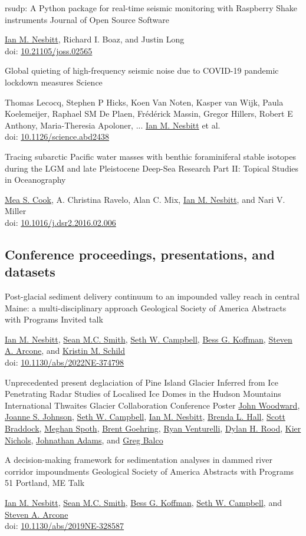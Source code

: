 \documentclass[a4paper,12pt,sans,colorlinks]{moderncv}
\newcommand{\me}{\href{https://www.iannesbitt.org}{Ian M. Nesbitt}}
\newcommand{\seth}{\href{https://www.alpinesciences.net}{Seth W. Campbell}}
\newcommand{\sean}{\href{https://umaine.edu/earthclimate/people/sean-m-c-smith/}{Sean M.C. Smith}}
\newcommand{\bess}{\href{https://www.colby.edu/directory/profile/bess.koffman/}{Bess G. Koffman}}
\newcommand{\stevearcone}{\href{https://engineering.dartmouth.edu/community/faculty/steven-arcone}{Steven A. Arcone}}
\newcommand{\kristin}{\href{https://climatechange.umaine.edu/people/kristin-schild/}{Kristin M. Schild}}
\newcommand{\richard}{Richard I. Boaz}
\newcommand{\mea}{\href{https://geosciences.williams.edu/profile/msc1/}{Mea S. Cook}}
\newcommand{\johnwoodward}{\href{https://www.northumbria.ac.uk/about-us/our-staff/w/john-woodward}{John Woodward}}
\newcommand{\joannejohnson}{\href{https://www.bas.ac.uk/profile/jsj/}{Joanne S. Johnson}}
\newcommand{\brenda}{\href{https://climatechange.umaine.edu/people/brenda-hall/}{Brenda L. Hall}}
\newcommand{\scott}{\href{https://climatechange.umaine.edu/people/scott-braddock/}{Scott Braddock}}
\newcommand{\meghan}{\href{https://climatechange.umaine.edu/people/meghan-spoth/}{Meghan Spoth}}
\newcommand{\brent}{\href{https://sse.tulane.edu/eens/faculty/goehring}{Brent Goehring}}
\newcommand{\ryanventurelli}{\href{https://sse.tulane.edu/eens/faculty/venturelli}{Ryan Venturelli}}
\newcommand{\dylanrood}{\href{http://www.imperial.ac.uk/people/d.rood}{Dylan H. Rood}}
\newcommand{\kiernichols}{\href{https://www.researchgate.net/profile/Keir-Nichols}{Kier Nichols}}
\newcommand{\johnathanadams}{\href{https://thwaitesglacier.org/people/jonathan-adams}{Johnathan Adams}}
\newcommand{\gregbalco}{\href{https://www.bgc.org/greg-balco}{Greg Balco}}
\newcommand{\doi}[1]{%
    \href{https://doi.org/#1}{#1}
}
\begin{document}
{rsudp: A Python package for real-time seismic
monitoring with Raspberry Shake instruments}
{Journal of Open Source Software}
{}
{}
{
    \me{}, \richard, and Justin Long
    \\
    doi: \doi{10.21105/joss.02565}
}

{Global quieting of high-frequency seismic noise
due to COVID-19 pandemic lockdown measures}
{Science}
{}
{}
{
    Thomas Lecocq, Stephen P Hicks, Koen Van Noten,
    Kasper van Wijk, Paula Koelemeijer, Raphael SM De Plaen,
    Frédérick Massin, Gregor Hillers, Robert E Anthony,
    Maria-Theresia Apoloner, ... \me{} et al.
    \\
    doi: \doi{10.1126/science.abd2438}
}

{Tracing subarctic Pacific water masses with benthic
foraminiferal stable isotopes during the LGM and late
Pleistocene}
{Deep-Sea Research Part II: Topical Studies in Oceanography}
{}
{}
{
    \mea{}, A. Christina Ravelo, Alan C. Mix, \me{},
    and Nari V. Miller
    \\
    doi: \doi{10.1016/j.dsr2.2016.02.006}
}


\newpage
\subsection{Conference proceedings, presentations, and datasets}

{Post-glacial sediment delivery continuum to an impounded
valley reach in central Maine: a multi-disciplinary approach}
{Geological Society of America Abstracts with Programs}
{}
{Invited talk}
{
    \me{}, \sean{}, \seth{}, \bess{}, \stevearcone{}, and \kristin{}
    \\
    doi: \doi{10.1130/abs/2022NE-374798}
}

{Unprecedented present deglaciation of Pine Island Glacier
Inferred from Ice Penetrating Radar Studies of Localised
Ice Domes in the Hudson Mountains}
{International Thwaites Glacier Collaboration Conference}
{}
{Poster}
{
    \johnwoodward{}, \joannejohnson{}, \seth{}, \me{}, \brenda{}, \scott{},
    \meghan{}, \brent{}, \ryanventurelli{}, \dylanrood{}, \kiernichols{},
    \johnathanadams{}, and \gregbalco{}
}

{A decision-making framework for sedimentation analyses in
dammed river corridor impoundments}
{Geological Society of America Abstracts with Programs 51}
{Portland, ME}
{Talk}
{
    \me{}, \sean{}, \bess{}, \seth{}, and \stevearcone{}
    \\
    doi: \doi{10.1130/abs/2019NE-328587}
}
\end{document}

